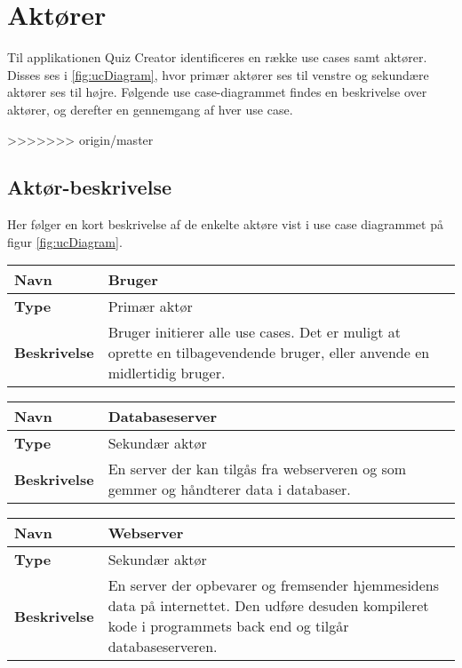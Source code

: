 \section{Aktører}

Til applikationen Quiz Creator identificeres en række use cases samt aktører. Disses ses i \ref{fig:ucDiagram}, hvor primær aktører ses til venstre og sekundære aktører ses til højre. Følgende use case-diagrammet findes en beskrivelse over aktører, og derefter en gennemgang af hver use case. 


>>>>>>> origin/master

\subsection{Aktør-beskrivelse}
Her følger en kort beskrivelse af de enkelte aktøre vist i use case diagrammet på figur \ref{fig:ucDiagram}.

\begin{tabular}{|p{2cm}|p{12cm}|}

\hline 
\textbf{Navn} & Bruger \\ 
\hline 
\textbf{Type} & Primær aktør \\ 
\hline 
\textbf{Beskrivelse} & Bruger initierer alle use cases. Det er muligt at oprette en tilbagevendende bruger, eller anvende en midlertidig bruger.\\ 
\hline 

\end{tabular} 

\begin{tabular}{|p{2cm}|p{12cm}|}

\hline 
\textbf{Navn} & Databaseserver \\ 
\hline 
\textbf{Type} & Sekundær aktør \\ 
\hline 
\textbf{Beskrivelse} & En server der kan tilgås fra webserveren og som gemmer og håndterer data i databaser.\\ 
\hline 

\end{tabular} 

\begin{tabular}{|p{2cm}|p{12cm}|}

\hline 
\textbf{Navn} & Webserver \\ 
\hline 
\textbf{Type} & Sekundær aktør \\ 
\hline 
\textbf{Beskrivelse} & En server der opbevarer og fremsender hjemmesidens data på internettet. Den udføre desuden kompileret kode i programmets back end og tilgår databaseserveren. \\ 
\hline 

\end{tabular} 
